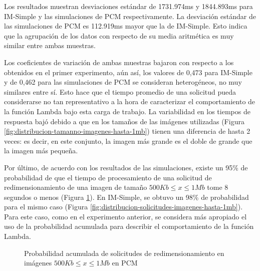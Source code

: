 Los resultados muestran desviaciones estándar de 1731.974ms y 1844.893ms para IM-Simple y las simulaciones de PCM respectivamente. La desviación estándar de las simulaciones de PCM es 112.919ms mayor que la de IM-Simple. Esto indica que la agrupación de los datos con respecto de su media aritmética es muy similar entre ambas muestras.

Los coeficientes de variación de ambas muestras bajaron con respecto a los obtenidos en el primer experimento, aún así, los valores de 0,473 para IM-Simple y de 0,462 para las simulaciones de PCM se consideran heterogéneos, no muy similares entre sí. Esto hace que el tiempo promedio de una solicitud pueda considerarse no tan representativo a la hora de caracterizar el comportamiento de la función Lambda bajo esta carga de trabajo. La variabilidad en los tiempos de respuesta bajó debido a que en los tamaños de las imágenes utilizadas (Figura \ref{fig:distribucion-tamanno-imagenes-hasta-1mb}) tienen una diferencia de hasta 2 veces: es decir, en este conjunto, la imagen más grande es el doble de grande que la imagen más pequeña.

Por último, de acuerdo con los resultados de las simulaciones, existe un 95\% de probabilidad de que el tiempo de procesamiento de una solicitud de redimensionamiento de una imagen de tamaño $500Kb \leq x \leq 1Mb$ tome 8 segundos o menos (Figura \ref{fig:funcion-acumulada-palladio-1mb}). En IM-Simple, se obtuvo un 98\% de probabilidad para el mismo caso (Figura \ref{fig:distribucion-solicitudes-imagenes-hasta-1mb}). Para este caso, como en el experimento anterior, se considera más apropiado el uso de la probabilidad acumulada para describir el comportamiento de la función Lambda.

\begin{figure}
\hspace{-2cm}
\caption{Probabilidad acumulada de solicitudes de redimensionamiento en imágenes $500Kb \leq x \leq 1Mb$ en PCM}
\label{fig:funcion-acumulada-palladio-1mb}
\end{figure}

